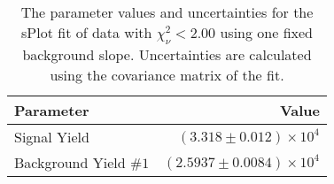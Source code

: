 
\begin{table}[ht]
    \begin{center}
        \begin{tabular}{lr}\toprule
            Parameter & Value \\\midrule
            Signal Yield & $(3.318 \pm 0.012) \times 10^{4}$ \\
            Background Yield $\#1$ & $(2.5937 \pm 0.0084) \times 10^{4}$ \\\bottomrule
        \end{tabular}
        \caption{The parameter values and uncertainties for the sPlot fit of data with $\chi^2_\nu < 2.00$ using one fixed background slope. Uncertainties are calculated using the covariance matrix of the fit.}\label{tab:splot-fit-results-chisqdof-2.00-fixed-1}
    \end{center}
\end{table}
